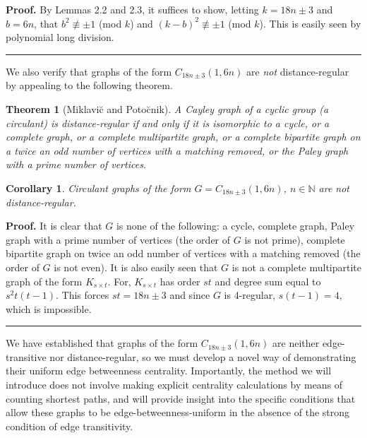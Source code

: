 \documentclass{article}%
\newtheorem{theorem}{Theorem}[section]
\newtheorem{corollary}{Corollary}[section]
\newenvironment{proof}[1][Proof]{\textbf{#1.} }{\ \rule{0.5em}{0.5em}}
\begin{document}
\begin{proof}
By Lemmas 2.2 and 2.3, it suffices to show, letting $k=18n \pm3$ and $b=6n$,
that $b^{2} \not \equiv \pm1$ (mod $k$) and $(k-b)^{2} \not \equiv \pm1$ (mod
$k$). This is easily seen by polynomial long division.
\end{proof}

\noindent\newline We also verify that graphs of the form $C_{18n \pm3}(1,6n)$
are \textit{not} distance-regular by appealing to the following theorem.

\begin{theorem}
[Miklavi\u{c} and Poto\u{c}nik]A Cayley graph of a cyclic group (a circulant)
is distance-regular if and only if it is isomorphic to a cycle, or a complete
graph, or a complete multipartite graph, or a complete bipartite graph on a
twice an odd number of vertices with a matching removed, or the Paley graph
with a prime number of vertices.
\end{theorem}

\begin{corollary}
Circulant graphs of the form $G=C_{18n\pm3}(1,6n)$, $n\in\mathbb{N}$ are not distance-regular.
\end{corollary}

\begin{proof}
It is clear that $G$ is none of the following: a cycle, complete graph, Paley
graph with a prime number of vertices (the order of $G$ is not prime),
complete bipartite graph on twice an odd number of vertices with a matching
removed (the order of $G$ is not even). It is also easily seen that $G$ is not
a complete multipartite graph of the form $K_{s\times t}$. For, $K_{s\times
t}$ has order $st$ and degree sum equal to $s^{2}t(t-1)$. This forces
$st=18n\pm3$ and since $G$ is 4-regular, $s(t-1)=4$, which is impossible.
\end{proof}

\bigskip

We have established that graphs of the form $C_{18n \pm3}(1,6n)$ are neither
edge-transitive nor distance-regular, so we must develop a novel way of
demonstrating their uniform edge betweenness centrality. Importantly, the
method we will introduce does not involve making explicit centrality
calculations by means of counting shortest paths, and will provide insight
into the specific conditions that allow these graphs to be
edge-betweenness-uniform in the absence of the strong condition of edge transitivity.
\end{document}

